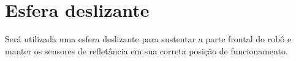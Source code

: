 

\section{Esfera deslizante} \label{cap:esfera}
Será utilizada uma esfera deslizante para sustentar a parte frontal do robô e manter os sensores de refletância em sua 
correta posição de funcionamento.
\vspace{0.5cm}













